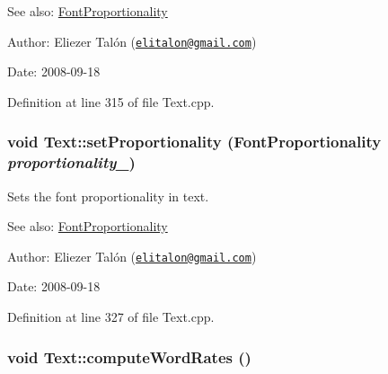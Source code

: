 \begin{Desc}
\item[See also:]\hyperlink{_font_proportionality_8h_a9aa255df24db58a9b4cbc46941f2ac1}{FontProportionality}\end{Desc}
\begin{Desc}
\item[Author:]Eliezer Talón (\href{mailto:elitalon@gmail.com}{\tt elitalon@gmail.com}) \end{Desc}
\begin{Desc}
\item[Date:]2008-09-18 \end{Desc}


Definition at line 315 of file Text.cpp.\hypertarget{class_text_3e99161a047df59a078043ca6c128788}{
\subsubsection[setProportionality]{\setlength{\rightskip}{0pt plus 5cm}void Text::setProportionality ({\bf FontProportionality} {\em proportionality\_\-})}}
\label{class_text_3e99161a047df59a078043ca6c128788}


Sets the font proportionality in text. 

\begin{Desc}
\item[See also:]\hyperlink{_font_proportionality_8h_a9aa255df24db58a9b4cbc46941f2ac1}{FontProportionality}\end{Desc}
\begin{Desc}
\item[Author:]Eliezer Talón (\href{mailto:elitalon@gmail.com}{\tt elitalon@gmail.com}) \end{Desc}
\begin{Desc}
\item[Date:]2008-09-18 \end{Desc}


Definition at line 327 of file Text.cpp.\hypertarget{class_text_8239e13039bcc1c713f66f1236693706}{
\subsubsection[computeWordRates]{\setlength{\rightskip}{0pt plus 5cm}void Text::computeWordRates ()}}
\label{class_text_8239e13039bcc1c713f66f1236693706}


